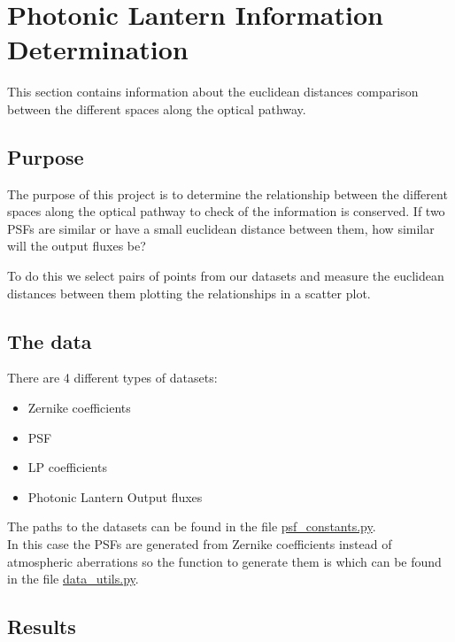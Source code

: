 \section{Photonic Lantern Information Determination}

	This section contains information about the euclidean distances comparison between the different spaces along the optical pathway.
	
	\subsection{Purpose}
		
		The purpose of this project is to determine the relationship between the different spaces along the optical pathway to check of the information is conserved. If two PSFs are similar or have a small euclidean distance between them, how similar will the output fluxes be?
		
		To do this we select pairs of points from our datasets and measure the euclidean distances between them plotting the relationships in a scatter plot.
		
		
	\subsection{The data}
		
		There are 4 different types of datasets:
		\begin{itemize}
			\item Zernike coefficients
			\item PSF
			\item LP coefficients
			\item Photonic Lantern Output fluxes
		\end{itemize}
		
		The paths to the datasets can be found in the file \href{https://github.com/Dacarpe03/PLImageReconstruction/blob/main/Utils/psf_constants.py}{psf\_constants.py}.\\
		
		In this case the PSFs are generated from Zernike coefficients instead of atmospheric aberrations so the function to generate them is  which can be found in the file  \href{https://github.com/Dacarpe03/PLImageReconstruction/blob/main/Utils/data_utils.py}{data\_utils.py}.\\
		
	\subsection{Results}
		
